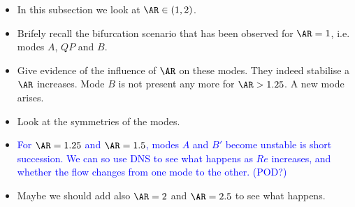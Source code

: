 \begin{itemize}
  \item In this subsection we look at $\AR \in (1,2)$.
  \item Brifely recall the bifurcation scenario that has been observed for $\AR=1$, i.e. modes $A$, $QP$ and $B$.
  \item Give evidence of the influence of $\AR$ on these modes. They indeed stabilise a $\AR$ increases. Mode $B$ is not present any more for $\AR>1.25$. A new mode arises.
  \item Look at the symmetries of the modes.  
  \item \textcolor{blue}{For $\AR=1.25$ and $\AR=1.5$, modes $A$ and $B'$ become unstable is short succession. We can so use DNS to see what happens as $Re$ increases, and whether the flow changes from one mode to the other. (POD?)}
  \item Maybe we should add also $\AR=2$ and $\AR=2.5$ to see what happens.
\end{itemize}
